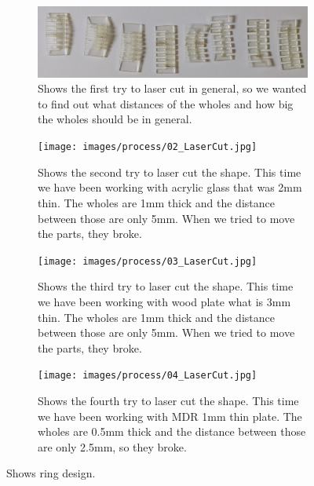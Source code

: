 \documentclass[doc.tex]{subfiles}
\begin{document}
        \begin{figure}[H]
            \centering
            \begin{subfigure}{.45\textwidth}
              \centering
              \includegraphics[width=0.8\linewidth]{images/process/01_LaserCut.jpg}
              \caption{Shows the first try to laser cut in general, so we wanted to
                       find out what distances of the wholes and how big the wholes 
                       should be in general.}
              \label{fig:01_LaserCut}
              \vspace{6mm}
            \end{subfigure}
            \hspace{1mm}
            \begin{subfigure}{.45\textwidth}
                \centering
                \texttt{[image: images/process/02\_LaserCut.jpg]}
                \caption{Shows the second try to laser cut the shape. This time we have been
                         working with acrylic glass that was 2mm thin. The wholes are 1mm thick 
                         and the distance between those are only 5mm. When we tried to move
                         the parts, they broke.}
                \label{fig:02_LaserCut}
                \vspace{6mm}
            \end{subfigure}
            \hspace{1mm}
            \begin{subfigure}{.45\textwidth}
                \centering
                \texttt{[image: images/process/03\_LaserCut.jpg]}
                \caption{Shows the third try to laser cut the shape. This time we have been
                         working with wood plate what is 3mm thin. The wholes are 1mm thick 
                         and the distance between those are only 5mm. When we tried to move
                         the parts, they broke.}
                \label{fig:03_LaserCut}
                \vspace{6mm}
            \end{subfigure}
            \hspace{1mm}
            \begin{subfigure}{.45\textwidth}
                \centering
                \texttt{[image: images/process/04\_LaserCut.jpg]}
                \caption{Shows the fourth try to laser cut the shape. This time we have been
                         working with MDR 1mm thin plate. The wholes are 0.5mm thick and the 
                         distance between those are only 2.5mm, so they broke.}
                \label{fig:04_LaserCut}
                \vspace{6mm}
            \end{subfigure}
            \caption{Shows ring design.}
            \label{fig:laserCutTests}
        \end{figure}
\end{document}
